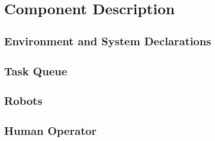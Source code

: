 \section{Component Description}

\subsection{Environment and System Declarations}

\subsection{Task Queue}

\subsection{Robots}

\subsection{Human Operator}